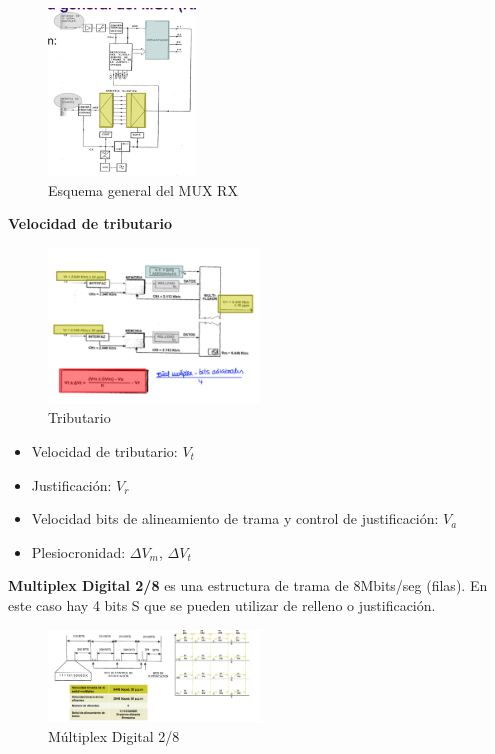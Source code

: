 \documentclass[10pt,portrait, twocolumn]{article}
\begin{document}
\begin{figure}[!ht]
	\centering
     \includegraphics[width=0.35\textwidth]{muxrx}
      \caption{Esquema general del MUX RX}
      \label{fig:Regiones de frecuencias}
\end{figure}

\textbf{Velocidad de tributario}

\begin{figure}[!ht]
	\centering
     \includegraphics[width=0.5\textwidth]{tributario}
      \caption{Tributario}
      \label{fig:Regiones de frecuencias}
\end{figure}

\begin{itemize}
\item Velocidad de tributario: $V_{t}$
\item Justificación: $V_{r}$
\item Velocidad bits de alineamiento de trama y control de justificación: $V_{a}$
\item Plesiocronidad: $\Delta V_{m}$, $\Delta V_{t}$
\end{itemize}

\textbf{Multiplex Digital 2/8} es una estructura de trama de 8Mbits/seg (filas). En este caso hay 4 bits S que se pueden utilizar de relleno o justificación.

\begin{figure}[!ht]
	\centering
     \includegraphics[width=0.5\textwidth]{mux28}
      \caption{Múltiplex Digital 2/8}
      \label{fig:Regiones de frecuencias}
\end{figure}
\end{document}
